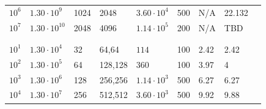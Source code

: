 \documentclass[aps, pre, onecolumn, nofootinbib, notitlepage, groupedaddress, amsfonts, amssymb, amsmath, longbibliography]{revtex4-1}
\begin{document}
\begin{center}
\begin{tabularx}{\textwidth}{ X X X X X X X X X }
$10^6$	&	$1.30 \cdot 10^9$	&	1024	&	2048	&	$3.60 \cdot 10^4$	&	500	&	N/A	&	22.132	\\
$10^7$	&	$1.30 \cdot 10^{10}$	&	2048	&	4096	&	$1.14 \cdot 10^5$	&	200	&	N/A	&	TBD	\\
\\ \hline \hline								\\							
$10^1$	&	$1.30 \cdot 10^4$	&	32	&	64,64	&	$114$	&	100	&	2.42	&	2.42	\\
$10^2$	&	$1.30 \cdot 10^5$	&	64	&	128,128	&	$360$	&	100	&	3.97	&	4	\\
$10^3$	&	$1.30 \cdot 10^6$	&	128	&	256,256	&	$1.14 \cdot 10^3$	&	500	&	6.27	&	6.27	\\
$10^4$	&	$1.30 \cdot 10^7$	&	256	&	512,512	&	$3.60 \cdot 10^3$	&	500	&	9.92	&	9.88	\\
\hline															
\end{tabularx}
\end{center}







\end{document}
